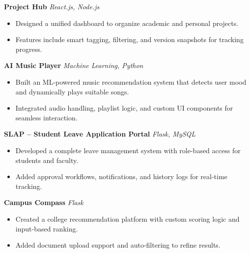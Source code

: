 \documentclass[a4paper,12pt]{article}
\begin{document}

\textbf{Project Hub}  
\textit{React.js, Node.js}
\begin{itemize}
    \item Designed a unified dashboard to organize academic and personal projects.
    \item Features include smart tagging, filtering, and version snapshots for tracking progress.
\end{itemize}

\textbf{AI Music Player}  
\textit{Machine Learning, Python}
\begin{itemize}
    \item Built an ML-powered music recommendation system that detects user mood and dynamically plays suitable songs.
    \item Integrated audio handling, playlist logic, and custom UI components for seamless interaction.
\end{itemize}

\textbf{SLAP – Student Leave Application Portal}  
\textit{Flask, MySQL}
\begin{itemize}
    \item Developed a complete leave management system with role-based access for students and faculty.
    \item Added approval workflows, notifications, and history logs for real-time tracking.
\end{itemize}

\textbf{Campus Compass}  
\textit{Flask}
\begin{itemize}
    \item Created a college recommendation platform with custom scoring logic and input-based ranking.
    \item Added document upload support and auto-filtering to refine results.
\end{itemize}
\end{document}
